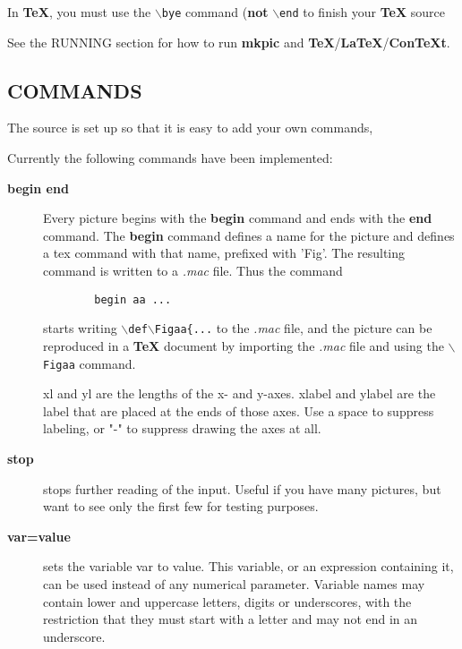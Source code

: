 \documentclass[a4paper,twocolumn]{article}
\begin{document}
In \textbf{TeX}, you must use the \texttt{$\backslash$bye} command (\textbf{not} \texttt{$\backslash$end} to finish your \textbf{TeX} source

See the RUNNING section for how to run \textbf{mkpic} and \textbf{TeX}/\textbf{LaTeX}/\textbf{ConTeXt}.

\subsection{COMMANDS\label{COMMANDS}}

The source is set up so that it is easy to add your own commands,

Currently the following commands have been implemented:

\begin{description}

\item[{\textbf{begin end}}] 

Every picture begins with the \textbf{begin} command and ends with the \textbf{end}
command.  The \textbf{begin} command defines a name for the picture and
defines a tex command with that name, prefixed with 'Fig'. The
resulting command is written to a \emph{.mac} file. Thus the command

\begin{verbatim}
        begin aa ...
\end{verbatim}

starts writing \texttt{$\backslash$def$\backslash$Figaa\{...} to the \emph{.mac} file, and the
picture can be reproduced in a \textbf{TeX} document by importing the \emph{.mac} file
and using the \texttt{$\backslash$Figaa} command.

xl and yl are the lengths of the x- and y-axes. xlabel and ylabel are
the label that are placed at the ends of those axes. Use a space to
suppress labeling, or "-" to suppress drawing the axes at all.

\item[{\textbf{stop}}] 

stops further reading of the input. Useful if you have many pictures,
but want to see only the first few for testing purposes.

\item[{\textbf{var=value}}] 

sets the variable var to value. This variable, or an expression containing it,
can be used instead of any numerical parameter. Variable names may contain 
lower and uppercase letters, digits or underscores, with the restriction that 
they must start with a letter and may not end in an underscore.


\end{description}
\end{document}

